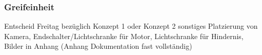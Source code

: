 \documentclass[main.tex]{subfiles} %
\begin{document}

\subsubsection{Greifeinheit}

Entscheid Freitag bezüglich Konzept 1 oder Konzept 2
sonstiges \newline
Platzierung von Kamera, Endschalter/Lichtschranke für Motor, Lichtschranke für Hindernis, \newline
Bilder in Anhang (Anhang Dokumentation fast vollständig)
\end{document}
